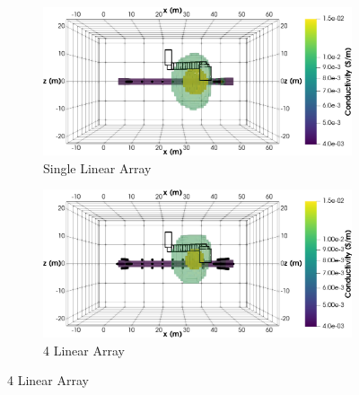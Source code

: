 \documentclass[preprint,authoryear,12pt]{elsarticle}
\begin{document}
\begin{figure}[htp]{}
   \begin{center}
      \begin{subfigure}{0.48\linewidth}
         \label{fig:SynthMosaic_Horseshoe_SingleLinear_South}
         \includegraphics[trim=0cm 0cm 0cm 0cm, clip=true,width=\linewidth]{./figures/Fig16a.png}
         \caption{Single Linear Array}
      \end{subfigure}
      \hspace{-0.7cm}
      \qquad
      \begin{subfigure}{0.48\linewidth}
         \label{fig:SynthMosaic_Horseshoe_4Linear_South}
         \includegraphics[trim=0cm 0cm 0cm 0cm, clip=true,width=\linewidth]{./figures/Fig16b.png}
         \caption{4 Linear Array}
      \end{subfigure}
      \vspace{0.2cm}


\end{center}
\end{figure}
\end{document}
